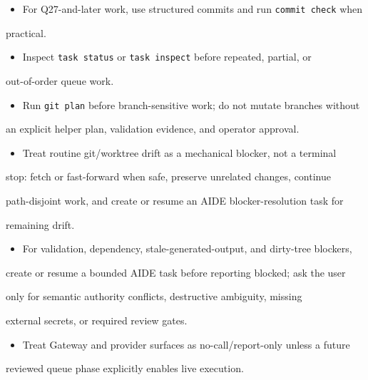 \documentclass[9pt,a4paper,openany]{book}
\begin{document}
\begin{itemize}
\item For Q27-\allowbreak{}and-\allowbreak{}later work, use structured commits and run \texttt{commit check} when
\end{itemize}
practical.\allowbreak{}

\begin{itemize}
\item Inspect \texttt{task status} or \texttt{task inspect} before repeated, partial, or
\end{itemize}
out-\allowbreak{}of-\allowbreak{}order queue work.\allowbreak{}

\begin{itemize}
\item Run \texttt{git plan} before branch-\allowbreak{}sensitive work; do not mutate branches without
\end{itemize}
an explicit helper plan, validation evidence, and operator approval.\allowbreak{}

\begin{itemize}
\item Treat routine git/\allowbreak{}worktree drift as a mechanical blocker, not a terminal
\end{itemize}
stop: fetch or fast-\allowbreak{}forward when safe, preserve unrelated changes, continue

path-\allowbreak{}disjoint work, and create or resume an AIDE blocker-\allowbreak{}resolution task for

remaining drift.\allowbreak{}

\begin{itemize}
\item For validation, dependency, stale-\allowbreak{}generated-\allowbreak{}output, and dirty-\allowbreak{}tree blockers,
\end{itemize}
create or resume a bounded AIDE task before reporting blocked; ask the user

only for semantic authority conflicts, destructive ambiguity, missing

external secrets, or required review gates.\allowbreak{}

\begin{itemize}
\item Treat Gateway and provider surfaces as no-\allowbreak{}call/\allowbreak{}report-\allowbreak{}only unless a future
\end{itemize}
reviewed queue phase explicitly enables live execution.\allowbreak{}
\end{document}
